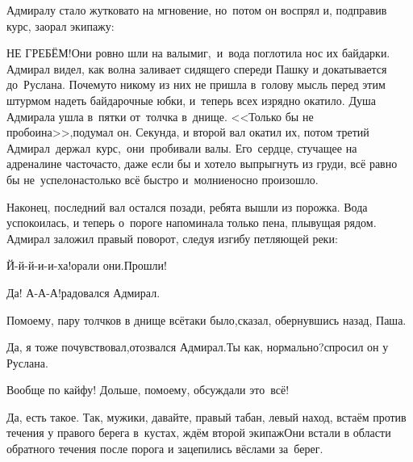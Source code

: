 Адмиралу стало жутковато на мгновение, но~потом он воспрял и, подправив курс, заорал экипажу:

\diagdash НЕ ГРЕБЁМ!\mdash Они ровно шли на валы\mdash миг,~и~вода поглотила нос их байдарки. Адмирал видел, как волна заливает сидящего спереди Пашку и докатывается до~Руслана. Почему\sdash то никому из них не пришла в~голову мысль перед этим штурмом надеть байдарочные юбки, и~теперь всех изрядно окатило. Душа Адмирала ушла в~пятки от~толчка в~днище. <<Только бы не пробоина>>,\mdash подумал он. Секунда, и второй вал окатил их, потом третий\myldots{} Адмирал~держал~курс,~они~пробивали валы. Его~сердце, стучащее на адреналине часто\sdash часто, даже если бы и хотело выпрыгнуть из груди, всё равно бы не~успело\mdash настолько всё быстро и~молниеносно произошло. 


Наконец, последний вал остался позади, ребята вышли из порожка. Вода успокоилась, и теперь о~пороге напоминала только пена, плывущая рядом. Адмирал заложил правый поворот, следуя изгибу петляющей реки:

\diagdash Й-й-й-и-и-ха!\mdash орали они.\mdash Прошли!

\diagdash Да! А-А-А!\mdash радовался Адмирал.

\diagdash По\sdash моему, пару толчков в днище всё\sdash таки было,\mdash сказал, обернувшись назад, Паша. 

\diagdash Да, я тоже почувствовал,\mdash отозвался Адмирал.\mdash Ты как, нормально?\mdash спросил он у Руслана.

\diagdash Вообще по кайфу! Дольше, по\sdash моему, обсуждали это~всё!

\diagdash Да, есть такое. Так, мужики, давайте, правый табан, левый наход, встаём против течения у правого берега в~кустах, ждём второй экипаж\myldots{}\mdash Они встали в области обратного течения после порога и зацепились вёслами за~берег.

